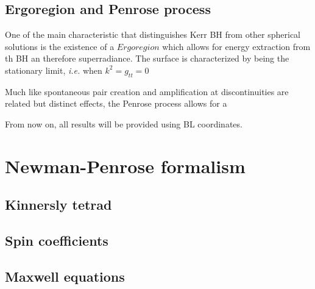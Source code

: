 \subsection{Ergoregion and Penrose process}

One of the main characteristic that distinguishes Kerr BH from other spherical solutions is the existence of a $Ergoregion$ which allows for energy extraction from th BH an therefore superradiance. The surface is characterized by being the stationary limit, \emph{i.e.} when $k^2=g_{tt}=0$

Much like spontaneous pair creation and amplification at discontinuities are related but distinct effects, the Penrose process allows for a 


From now on, all results will be provided using BL coordinates.

\section{Newman-Penrose formalism}

\subsection{Kinnersly tetrad}
\subsection{Spin coefficients}
\subsection{Maxwell equations}


\cleardoublepage